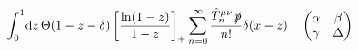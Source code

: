 \documentclass[border=12pt]{standalone}
\begin{document}
$\displaystyle \int_0^1\!\mathrm{d}z\,\Theta(1-z-\delta)\left[\frac{\ln(1-z)}{1-z}\right]_{+}\sum_{n=0}^{\infty}\frac{\hat{T}^{\mu\nu}_{n}\,\slashed{p}}{n!}\delta(x-z)\quad\begin{pmatrix}\alpha&\beta\\\gamma&\Delta\end{pmatrix}$
\end{document}
